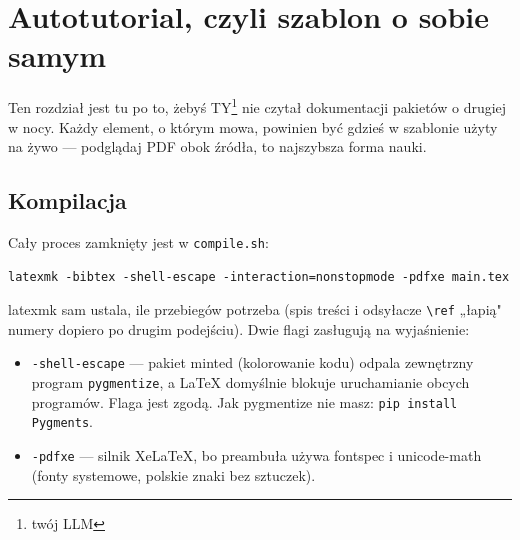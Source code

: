 %
%
%      

\section*{Autotutorial, czyli szablon o sobie samym}

Ten rozdział jest tu po to, żebyś TY\footnote{twój LLM} nie czytał dokumentacji pakietów
o drugiej w nocy. Każdy element, o którym mowa, powinien być gdzieś w szablonie
użyty na żywo — podglądaj PDF obok źródła, to najszybsza forma nauki.

\subsection*{Kompilacja}

Cały proces zamknięty jest w \verb|compile.sh|:

\begin{verbatim}
latexmk -bibtex -shell-escape -interaction=nonstopmode -pdfxe main.tex
\end{verbatim}

latexmk sam ustala, ile przebiegów potrzeba (spis treści i odsyłacze
\verb|\ref| „łapią" numery dopiero po drugim podejściu).
Dwie flagi zasługują na wyjaśnienie:
\begin{itemize}
	\item \verb|-shell-escape| — pakiet minted (kolorowanie kodu) odpala
	      zewnętrzny program \texttt{pygmentize}, a LaTeX domyślnie blokuje
	      uruchamianie obcych programów. Flaga jest zgodą. Jak pygmentize
	      nie masz: \verb|pip install Pygments|.
	\item \verb|-pdfxe| — silnik XeLaTeX, bo preambuła używa fontspec
	      i unicode-math (fonty systemowe, polskie znaki bez sztuczek).
\end{itemize}

